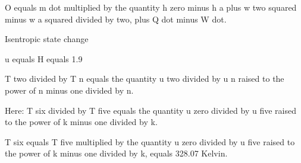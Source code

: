 O equals m dot multiplied by the quantity h zero minus h a plus w two squared minus w a squared divided by two, plus Q dot minus W dot.  

Isentropic state change  

u equals H equals 1.9  

T two divided by T n equals the quantity u two divided by u n raised to the power of n minus one divided by n.  

Here:  
T six divided by T five equals the quantity u zero divided by u five raised to the power of k minus one divided by k.  

T six equals T five multiplied by the quantity u zero divided by u five raised to the power of k minus one divided by k, equals 328.07 Kelvin.